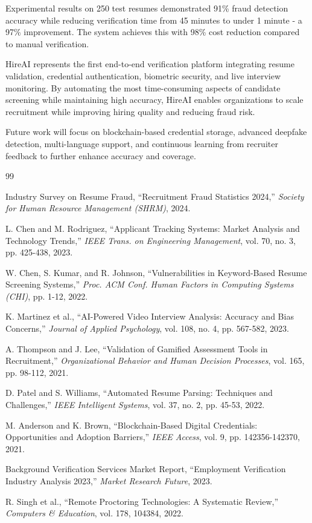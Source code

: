 \documentclass[journal]{IEEEtran}
\begin{document}
Experimental results on 250 test resumes demonstrated 91\% fraud detection accuracy while reducing verification time from 45 minutes to under 1 minute - a 97\% improvement. The system achieves this with 98\% cost reduction compared to manual verification.

HireAI represents the first end-to-end verification platform integrating resume validation, credential authentication, biometric security, and live interview monitoring. By automating the most time-consuming aspects of candidate screening while maintaining high accuracy, HireAI enables organizations to scale recruitment while improving hiring quality and reducing fraud risk.

Future work will focus on blockchain-based credential storage, advanced deepfake detection, multi-language support, and continuous learning from recruiter feedback to further enhance accuracy and coverage.

\begin{thebibliography}{99}

Industry Survey on Resume Fraud, ``Recruitment Fraud Statistics 2024,'' \emph{Society for Human Resource Management (SHRM)}, 2024.

L. Chen and M. Rodriguez, ``Applicant Tracking Systems: Market Analysis and Technology Trends,'' \emph{IEEE Trans. on Engineering Management}, vol. 70, no. 3, pp. 425-438, 2023.

W. Chen, S. Kumar, and R. Johnson, ``Vulnerabilities in Keyword-Based Resume Screening Systems,'' \emph{Proc. ACM Conf. Human Factors in Computing Systems (CHI)}, pp. 1-12, 2022.

K. Martinez et al., ``AI-Powered Video Interview Analysis: Accuracy and Bias Concerns,'' \emph{Journal of Applied Psychology}, vol. 108, no. 4, pp. 567-582, 2023.

A. Thompson and J. Lee, ``Validation of Gamified Assessment Tools in Recruitment,'' \emph{Organizational Behavior and Human Decision Processes}, vol. 165, pp. 98-112, 2021.

D. Patel and S. Williams, ``Automated Resume Parsing: Techniques and Challenges,'' \emph{IEEE Intelligent Systems}, vol. 37, no. 2, pp. 45-53, 2022.

M. Anderson and K. Brown, ``Blockchain-Based Digital Credentials: Opportunities and Adoption Barriers,'' \emph{IEEE Access}, vol. 9, pp. 142356-142370, 2021.

Background Verification Services Market Report, ``Employment Verification Industry Analysis 2023,'' \emph{Market Research Future}, 2023.

R. Singh et al., ``Remote Proctoring Technologies: A Systematic Review,'' \emph{Computers \& Education}, vol. 178, 104384, 2022.

\end{thebibliography}
\end{document}
